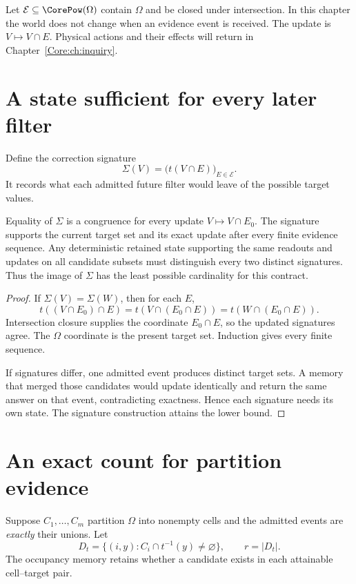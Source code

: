 Let $\mathcal E\subseteq\CorePow(\Omega)$ contain $\Omega$ and be closed under intersection. In this chapter the world does not change when an evidence event is received. The update is $V\mapsto V\cap E$. Physical actions and their effects will return in Chapter~\ref{Core:ch:inquiry}.

\section{A state sufficient for every later filter}
Define the correction signature
\[
\Sigma(V)=\bigl(t(V\cap E)\bigr)_{E\in\mathcal E}.
\]
It records what each admitted future filter would leave of the possible target values.

\begin{Coretheorem}\label{Core:r:memory}
Equality of $\Sigma$ is a congruence for every update $V\mapsto V\cap E_0$. The signature supports the current target set and its exact update after every finite evidence sequence. Any deterministic retained state supporting the same readouts and updates on all candidate subsets must distinguish every two distinct signatures. Thus the image of $\Sigma$ has the least possible cardinality for this contract.
\end{Coretheorem}
\begin{proof}
If $\Sigma(V)=\Sigma(W)$, then for each $E$,
\[
t((V\cap E_0)\cap E)=t(V\cap(E_0\cap E))=t(W\cap(E_0\cap E)).
\]
Intersection closure supplies the coordinate $E_0\cap E$, so the updated signatures agree. The $\Omega$ coordinate is the present target set. Induction gives every finite sequence.

If signatures differ, one admitted event produces distinct target sets. A memory that merged those candidates would update identically and return the same answer on that event, contradicting exactness. Hence each signature needs its own state. The signature construction attains the lower bound.
\end{proof}

\section{An exact count for partition evidence}
Suppose $C_1,\ldots,C_m$ partition $\Omega$ into nonempty cells and the admitted events are \emph{exactly} their unions. Let
\[
D_t=\{(i,y): C_i\cap t^{-1}(y)\ne\varnothing\},\qquad r=|D_t|.
\]
The occupancy memory retains whether a candidate exists in each attainable cell--target pair.

